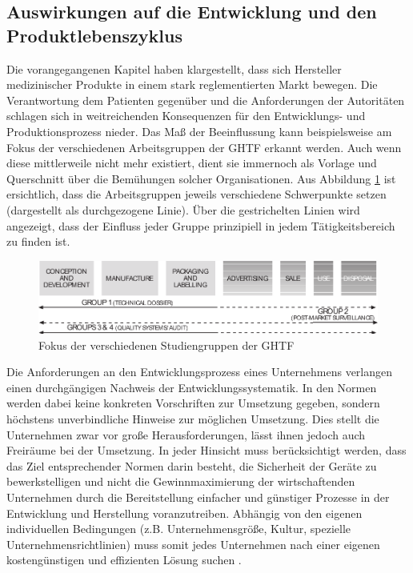 \documentclass[a4paper,12pt]{report}
\begin{document}
\subsection{Auswirkungen auf die Entwicklung und den Produktlebenszyklus}\label{subsec:AuswirkungenAufEntwicklung}
Die vorangegangenen Kapitel haben klargestellt, dass sich Hersteller medizinischer Produkte in einem stark reglementierten Markt bewegen. Die Verantwortung dem Patienten gegenüber und die Anforderungen der Autoritäten schlagen sich in weitreichenden Konsequenzen für den Entwicklungs- und Produktionsprozess nieder. Das Maß der Beeinflussung kann beispielsweise am Fokus der verschiedenen Arbeitsgruppen der GHTF erkannt werden. Auch wenn diese mittlerweile nicht mehr existiert, dient sie immernoch als Vorlage und Querschnitt über die Bemühungen solcher Organisationen. Aus Abbildung \ref{ghtf_focus} ist ersichtlich, dass die Arbeitsgruppen jeweils verschiedene Schwerpunkte setzen (dargestellt als durchgezogene Linie). Über die gestrichelten Linien wird angezeigt, dass der Einfluss jeder Gruppe prinzipiell in jedem Tätigkeitsbereich zu finden ist.
\begin{figure}[ht]
\centering
\includegraphics[width=1\textwidth]{Images/ghtf_focus}
\caption[Fokus der verschiedenen Studiengruppen der GHTF]{Fokus der verschiedenen Studiengruppen der GHTF \citep[S. 16]{Cheng2003}}
\label{ghtf_focus}
\end{figure}

Die Anforderungen an den Entwicklungsprozess eines Unternehmens verlangen einen durchgängigen Nachweis der Entwicklungssystematik. In den Normen werden dabei keine konkreten Vorschriften zur Umsetzung gegeben, sondern höchstens unverbindliche Hinweise zur möglichen Umsetzung. Dies stellt die Unternehmen zwar vor große Herausforderungen, lässt ihnen jedoch auch Freiräume bei der Umsetzung. In jeder Hinsicht muss berücksichtigt werden, dass das Ziel entsprechender Normen darin besteht, die Sicherheit der Geräte zu bewerkstelligen und nicht die Gewinnmaximierung der wirtschaftenden Unternehmen durch die Bereitstellung einfacher und günstiger Prozesse in der Entwicklung und Herstellung voranzutreiben. Abhängig von den eigenen individuellen Bedingungen (z.B. Unternehmensgröße, Kultur, spezielle Unternehmensrichtlinien) muss somit jedes Unternehmen nach einer eigenen kostengünstigen und effizienten Lösung suchen \citep[vgl.][S. 103-107]{Johner2015}.
\end{document}
